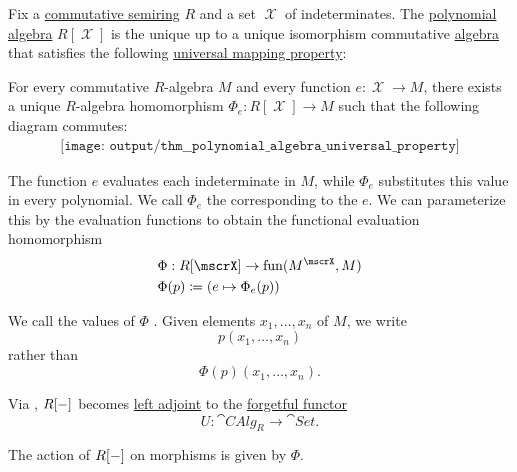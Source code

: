 \begin{theorem}\label{thm:polynomial_algebra_universal_property}
  Fix a \hyperref[def:semiring/commutative]{commutative semiring} \( R \) and a set \( \mscrX \) of indeterminates. The \hyperref[def:polynomial_algebra]{polynomial algebra} \( R[\mscrX] \) is the unique up to a unique isomorphism commutative \hyperref[def:algebra_over_semiring]{algebra} that satisfies the following \hyperref[rem:universal_mapping_property]{universal mapping property}:
  \begin{displayquote}
    For every commutative \( R \)-algebra \( M \) and every function \( e: \mscrX \to M \), there exists a unique \( R \)-algebra homomorphism \( \Phi_e: R[\mscrX] \to M \) such that the following diagram commutes:
    \begin{equation}\label{eq:thm:polynomial_algebra_universal_property/diagram}
      \begin{aligned}
        \texttt{[image: output/thm\_\_polynomial\_algebra\_universal\_property]}
      \end{aligned}
    \end{equation}
  \end{displayquote}
\end{theorem}
\begin{comments}
  \item The function \( e \) evaluates each indeterminate in \( M \), while \( \Phi_e \) substitutes this value in every polynomial. We call \( \Phi_e \) the  corresponding to the  \( e \). We can parameterize this by the evaluation functions to obtain the functional evaluation homomorphism
  \begin{equation*}
    \begin{aligned}
      &\Phi: R[\mscrX] \to \fun(M^\mscrX, M) \\
      &\Phi(p) \coloneqq (e \mapsto \Phi_e(p))
    \end{aligned}
  \end{equation*}

  \item We call the values of \( \Phi \) . Given elements \( x_1, \ldots, x_n \) of \( M \), we write
  \begin{equation*}
    p(x_1, \ldots, x_n)
  \end{equation*}
  rather than
  \begin{equation*}
    \Phi(p)(x_1, \ldots, x_n).
  \end{equation*}

  \item Via , \( R[\anon*] \) becomes \hyperref[def:category_adjunction]{left adjoint} to the \hyperref[def:concrete_category]{forgetful functor}
  \begin{equation*}
    U: \cat{CAlg}_R \to \cat{Set}.
  \end{equation*}

  The action of \( R[\anon*] \) on morphisms is given by \( \Phi \).
\end{comments}
